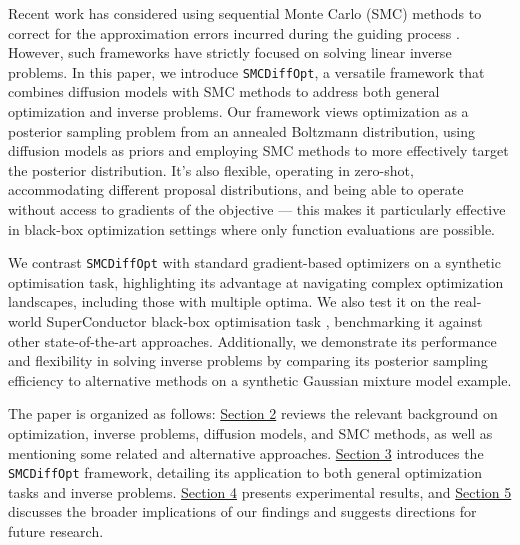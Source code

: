 Recent work has considered using sequential Monte Carlo (SMC) methods
\parencite{chopinIntroductionSequentialMonte2020} to correct for the approximation errors incurred
during the guiding process
\parencite{trippeDiffusionProbabilisticModeling2023,cardosoMonteCarloGuided2023,douDiffusionPosteriorSampling2023,wuPracticalAsymptoticallyExact2023}.
However, such frameworks have strictly focused on solving linear inverse problems.
In this paper, we introduce \texttt{SMCDiffOpt}, a versatile framework that combines diffusion models
with SMC methods to address both general optimization and inverse problems. Our framework views
optimization as a posterior sampling problem from an annealed Boltzmann distribution, using
diffusion models as priors and employing SMC methods to more effectively target the posterior
distribution. It's also flexible, operating in zero-shot, accommodating different proposal
distributions, and being able to operate without access to gradients of the objective --- this makes
it particularly effective in black-box optimization settings where only function evaluations are
possible.

We contrast \texttt{SMCDiffOpt} with standard gradient-based optimizers on a synthetic optimisation
task, highlighting its advantage at navigating complex optimization landscapes, including those
with multiple optima. We also test it on the real-world SuperConductor black-box optimisation task
\parencite{trabuccoDesignBenchBenchmarksDataDriven2022}, benchmarking it against other
state-of-the-art approaches. Additionally, we demonstrate its performance and flexibility in solving
inverse problems by comparing its posterior sampling efficiency to alternative methods on a
synthetic Gaussian mixture model example.

The paper is organized as follows: \hyperref[chap:background]{Section 2} reviews the relevant
background on optimization, inverse problems, diffusion models, and SMC methods, as well as
mentioning some related and alternative approaches. \hyperref[chap:methods]{Section 3} introduces
the \texttt{SMCDiffOpt} framework, detailing its application to both general optimization tasks and
inverse problems.  \hyperref[chap:experiments]{Section 4} presents experimental results, and
\hyperref[chap:discussion]{Section 5} discusses the broader implications of our findings and
suggests directions for future research.
